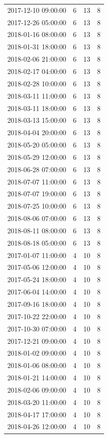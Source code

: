\begin{tabular}{lrrr}
2017-12-10 09:00:00 & 6 & 13 & 8 \\
2017-12-26 05:00:00 & 6 & 13 & 8 \\
2018-01-16 08:00:00 & 6 & 13 & 8 \\
2018-01-31 18:00:00 & 6 & 13 & 8 \\
2018-02-06 21:00:00 & 6 & 13 & 8 \\
2018-02-17 04:00:00 & 6 & 13 & 8 \\
2018-02-28 10:00:00 & 6 & 13 & 8 \\
2018-03-11 11:00:00 & 6 & 13 & 8 \\
2018-03-11 18:00:00 & 6 & 13 & 8 \\
2018-03-13 15:00:00 & 6 & 13 & 8 \\
2018-04-04 20:00:00 & 6 & 13 & 8 \\
2018-05-20 05:00:00 & 6 & 13 & 8 \\
2018-05-29 12:00:00 & 6 & 13 & 8 \\
2018-06-28 07:00:00 & 6 & 13 & 8 \\
2018-07-07 11:00:00 & 6 & 13 & 8 \\
2018-07-07 19:00:00 & 6 & 13 & 8 \\
2018-07-25 10:00:00 & 6 & 13 & 8 \\
2018-08-06 07:00:00 & 6 & 13 & 8 \\
2018-08-11 08:00:00 & 6 & 13 & 8 \\
2018-08-18 05:00:00 & 6 & 13 & 8 \\
2017-01-07 11:00:00 & 4 & 10 & 8 \\
2017-05-06 12:00:00 & 4 & 10 & 8 \\
2017-05-24 18:00:00 & 4 & 10 & 8 \\
2017-06-04 14:00:00 & 4 & 10 & 8 \\
2017-09-16 18:00:00 & 4 & 10 & 8 \\
2017-10-22 22:00:00 & 4 & 10 & 8 \\
2017-10-30 07:00:00 & 4 & 10 & 8 \\
2017-12-21 09:00:00 & 4 & 10 & 8 \\
2018-01-02 09:00:00 & 4 & 10 & 8 \\
2018-01-06 08:00:00 & 4 & 10 & 8 \\
2018-01-21 14:00:00 & 4 & 10 & 8 \\
2018-02-06 09:00:00 & 4 & 10 & 8 \\
2018-03-20 11:00:00 & 4 & 10 & 8 \\
2018-04-17 17:00:00 & 4 & 10 & 8 \\
2018-04-26 12:00:00 & 4 & 10 & 8 \\

\end{tabular}
